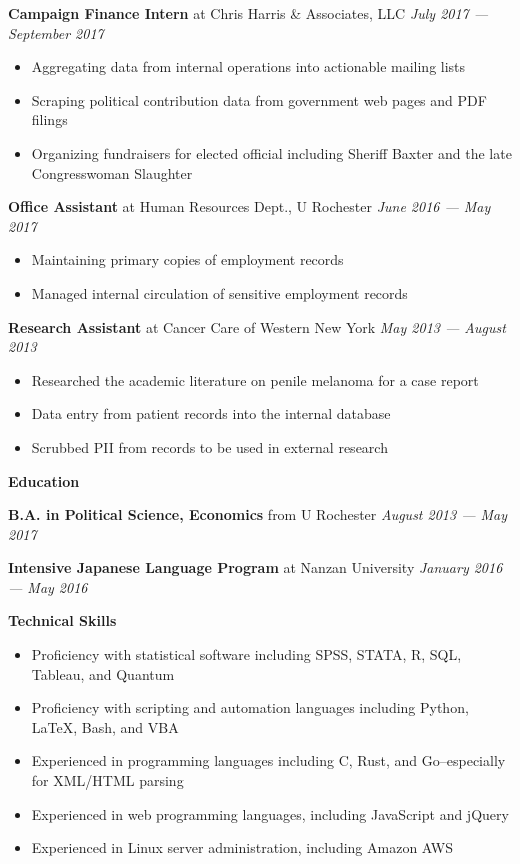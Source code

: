 \documentclass[12pt]{article}
\newenvironment{details}{
\begin{itemize}[label={}]
	\small \setlength{\itemsep}{0pt}
}{\end{itemize}}
\begin{document}
\normalsize
\textbf{Campaign Finance Intern} at Chris Harris \& Associates, LLC \hfill \textit{July 2017 --- September 2017}
\begin{details}
	\item Aggregating data from internal operations into actionable mailing lists
	\item Scraping political contribution data from government web pages and PDF filings
	\item Organizing fundraisers for elected official including Sheriff Baxter and the late Congresswoman Slaughter
\end{details}

\normalsize
\textbf{Office Assistant} at Human Resources Dept., U Rochester  \hfill \textit{June 2016 --- May 2017}
\begin{details}
	\item Maintaining primary copies of employment records
	\item Managed internal circulation of sensitive employment records
\end{details}

\normalsize
\textbf{Research Assistant} at Cancer Care of Western New York  \hfill \textit{May 2013 --- August 2013}
\begin{details}
	\item Researched the academic literature on penile melanoma for a case report
	\item Data entry from patient records into the internal database
	\item Scrubbed PII from records to be used in external research
\end{details}

\vspace{.1in}
\large
\textbf{Education} \hrulefill

\vspace{.05in}
\normalsize
\textbf{B.A. in Political Science, Economics} from U Rochester \hfill \textit{August 2013 --- May 2017}

\vspace{.05in}
\normalsize
\textbf{Intensive Japanese Language Program} at Nanzan University \hfill \textit{January 2016 --- May 2016}

\vspace{.1in}
\large
\textbf{Technical Skills} \hrulefill

\normalsize
\begin{details}
	\item Proficiency with statistical software including SPSS, STATA, R, SQL, Tableau, and Quantum
	\item Proficiency with scripting and automation languages including Python, \LaTeX, Bash, and VBA
	\item Experienced in programming languages including C, Rust, and Go--especially for XML/HTML parsing
	\item Experienced in web programming languages, including JavaScript and jQuery
	\item Experienced in Linux server administration, including Amazon AWS
\end{details}
\end{document}
